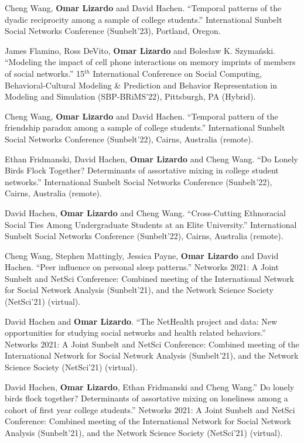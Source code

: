 \ind Cheng Wang, {\bf Omar Lizardo} and David Hachen. ``Temporal patterns of the dyadic reciprocity among a sample of college students.'' International Sunbelt Social Networks Conference (Sunbelt'23), Portland, Oregon.	

\ind James Flamino, Ross DeVito, {\bf Omar Lizardo} and Boles\l{}aw K. Szyma\'{n}ski. ``Modeling the impact of cell phone interactions on memory imprints of members of social networks.'' 15$^{th}$ International Conference on Social Computing, Behavioral-Cultural Modeling \& Prediction and Behavior Representation in Modeling and Simulation (SBP-BRiMS'22), Pittsburgh, PA (Hybrid). 

\ind Cheng Wang, {\bf Omar Lizardo} and David Hachen. ``Temporal pattern of the friendship paradox among a sample of college students.''  International Sunbelt Social Networks Conference (Sunbelt'22), Cairns, Australia (remote).	

\ind Ethan Fridmanski, David Hachen, {\bf Omar Lizardo} and Cheng Wang. ``Do Lonely Birds Flock Together? Determinants of assortative mixing in college student networks.''	International Sunbelt Social Networks Conference (Sunbelt'22), Cairns, Australia (remote).

\ind David Hachen, {\bf Omar Lizardo} and Cheng Wang.	``Cross-Cutting Ethnoracial Social Ties Among Undergraduate Students at an Elite University.'' International Sunbelt Social Networks Conference (Sunbelt'22), Cairns, Australia (remote).

\ind Cheng Wang, Stephen Mattingly, Jessica Payne, {\bf Omar Lizardo} and David Hachen. ``Peer influence on personal sleep patterns.''	Networks 2021: A Joint Sunbelt and NetSci Conference: Combined meeting of the International Network for Social Network Analysis (Sunbelt'21), and the Network Science Society (NetSci'21) (virtual).

\ind David Hachen and {\bf Omar Lizardo}. ``The NetHealth project and data: New opportunities for studying social networks and health related behaviors.'' Networks 2021: A Joint Sunbelt and NetSci Conference: Combined meeting of the International Network for Social Network Analysis (Sunbelt'21), and the Network Science Society (NetSci'21) (virtual).

\ind David Hachen, {\bf Omar Lizardo}, Ethan Fridmanski and Cheng Wang.'' Do lonely birds flock together? Determinants of assortative mixing on loneliness among a cohort of first year college students.'' Networks 2021: A Joint Sunbelt and NetSci Conference: Combined meeting of the International Network for Social Network Analysis (Sunbelt'21), and the Network Science Society (NetSci'21) (virtual).


